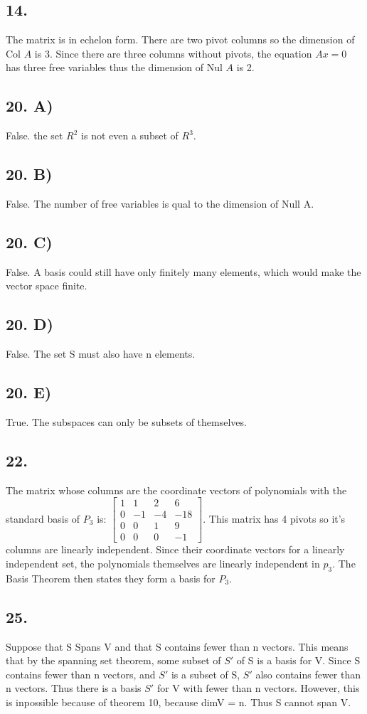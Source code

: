 \documentclass[12]{scrartcl}
\begin{document}
\subsection*{14.}
The matrix is in echelon form. There are two pivot columns so the dimension of Col $A$ is 3. Since there are three columns without pivots, the equation $Ax = 0 $ has three free variables thus the dimension of Nul $A$ is 2. 
\subsection*{20. A)}
False. the set $R^2$ is not even a subset of $R^3$. 
\subsection*{20. B)}
False. The number of free variables is qual to the dimension of Null A. 
\subsection*{20. C)}
False. A basis could still have only finitely many elements, which would make the vector space finite. 
\subsection*{20. D)}
False. The set S must also have n elements. 
\subsection*{20. E)}
True. The subspaces can only be subsets of themselves. 

\subsection*{22.}
The matrix whose columns are the coordinate vectors of polynomials with the standard basis of $P_3$ is:
$\begin{bmatrix} 1 & 1 & 2 & 6 \\ 0 & -1 & -4 & -18 \\ 0 & 0 & 1 & 9 \\ 0 & 0 & 0 & -1  \end{bmatrix}$. This matrix has 4 pivots so it's columns are linearly independent. Since their coordinate vectors for a linearly independent set, the polynomials themselves are linearly independent in $p_3$. The Basis Theorem then states they form a basis for $P_3$.
\subsection*{25.}
Suppose that S Spans V and that S contains fewer than n vectors. This means that by the spanning set theorem, some subset of $S'$ of S is a basis for V. Since S contains fewer than n vectors, and $S'$  is a subset of S, $S'$ also contains fewer than n vectors. Thus there is a basis $S'$ for V with fewer than n vectors. However, this is inpossible because of theorem 10, because dimV = n. Thus S cannot span V. 
\end{document}
